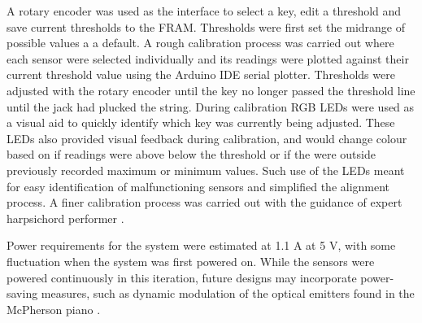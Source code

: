 A rotary encoder was used as the interface to select a key, edit a threshold and save current thresholds to the FRAM.
Thresholds were first set the midrange of possible values a a default. A rough calibration process was carried out where each sensor were selected individually and its readings were plotted against their current threshold value using the Arduino IDE serial plotter. Thresholds were adjusted with the rotary encoder until the key no longer passed the threshold line until the jack had plucked the string. During calibration RGB LEDs were used as a visual aid to quickly identify which key was currently being adjusted. These LEDs also provided visual feedback during calibration, and would change colour based on if readings were above below the threshold or if the were outside previously recorded maximum or minimum values. Such use of the LEDs meant for easy identification of malfunctioning sensors and simplified the alignment process. A finer calibration process was carried out with the guidance of expert harpsichord performer .

Power requirements for the system were estimated at 1.1 A at 5 V, with some fluctuation when the system was first powered on. While the sensors were powered continuously in this iteration, future designs may incorporate power-saving measures, such as dynamic modulation of the optical emitters found in the McPherson piano \cite{McPherson2013}.


